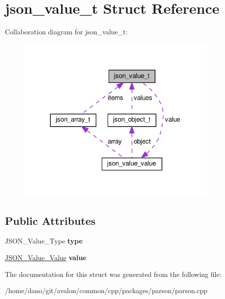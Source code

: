 \hypertarget{structjson__value__t}{}\section{json\+\_\+value\+\_\+t Struct Reference}
\label{structjson__value__t}


Collaboration diagram for json\+\_\+value\+\_\+t\+:
\nopagebreak
\begin{figure}[H]
\begin{center}
\leavevmode
\includegraphics[width=280pt]{structjson__value__t__coll__graph}
\end{center}
\end{figure}
\subsection*{Public Attributes}
\begin{DoxyCompactItemize}
\item 
\mbox{\label{structjson__value__t_a2542a563b2a035c4be090360dbd31174}} 
J\+S\+O\+N\+\_\+\+Value\+\_\+\+Type {\bfseries type}
\item 
\mbox{\label{structjson__value__t_aed94ef4fcdc948dff1b51656074eae25}} 
\hyperlink{unionjson__value__value}{J\+S\+O\+N\+\_\+\+Value\+\_\+\+Value} {\bfseries value}
\end{DoxyCompactItemize}


The documentation for this struct was generated from the following file\+:\begin{DoxyCompactItemize}
\item 
/home/dano/git/avalon/common/cpp/packages/parson/parson.\+cpp\end{DoxyCompactItemize}
